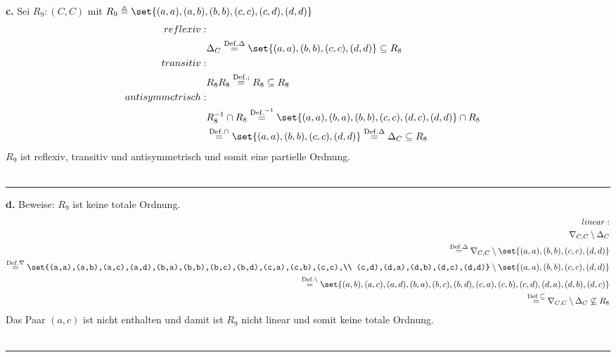 \documentclass[10pt,leqno ]{article}
\DeclarePairedDelimiter\set\{\}
\newcommand\customeq[1]{\overset{\mathrm{#1}}{=}}
\theoremstyle{definition}
\newenvironment{solution}[1][L]{\begin{doublespace}\textbf{#1.}\quad }{\ \rule{0.5em}{0.5em}\end{doublespace}}
\begin{document}
\begin{solution}[c]
Sei $R_9 :(C,C)$ mit $R_9 \triangleq \set{ (a, a), (a, b), (b, b), (c, c), (c, d), (d, d) }$\\
\begin{equation*}
    \begin{aligned}
    reflexiv:\\ 
    &\Delta_C \customeq{Def. \Delta} \set{(a,a),(b,b),(c,c),(d,d)} \subseteq{}R_8\\
    transitiv:\\ 
    & R_8R_8 \customeq{Def. ;} R_8\subseteq R_8\\
    antisymmetrisch:\\
    & R_8^{-1} \cap R_8 \customeq{Def. ^{-1}} \set{(a,a),(b,a),(b,b),(c,c),(d,c),(d,d)} \cap R_8\\
    &\customeq{Def. \cap} \set{(a,a),(b,b),(c,c),(d,d)} \customeq{Def. \Delta} \Delta_C \subseteq{}R_8\\
    \end{aligned}
\end{equation*}
   $R_9$ ist reflexiv, transitiv und antisymmetrisch und somit eine partielle Ordnung. \\
\end{solution}

\begin{solution}[d]
    Beweise: $R_9$ ist keine totale Ordnung.
\begin{equation*}
    \begin{aligned}
    linear:\\
    \nabla_{C,C} \setminus \Delta_C\\
    \customeq{Def. \Delta} \nabla_{C,C} \setminus \set{(a,a),(b,b),(c,c),(d,d)}\\
    \customeq{Def. \nabla} \set{(a,a),(a,b),(a,c),(a,d),(b,a),(b,b),(b,c),(b,d),(c,a),(c,b),(c,c),\\
    (c,d),(d,a),(d,b),(d,c),(d,d)} \setminus \set{(a,a),(b,b),(c,c),(d,d)}\\
    \customeq{Def. \setminus} \set{(a, b),(a, c),(a, d),(b, a),(b, c),(b, d),(c, a),(c, b),(c, d),(d, a),(d, b),(d, c)}\\
    \customeq{Def. \subseteq}\nabla_{C,C} \setminus \Delta_C \not \subseteq R_8\\
    \end{aligned}
\end{equation*}
Das Paar $(a,c)$ ist nicht enthalten und damit ist $R_9$ nicht linear und somit keine totale Ordnung. \\
\end{solution}
\end{document}
